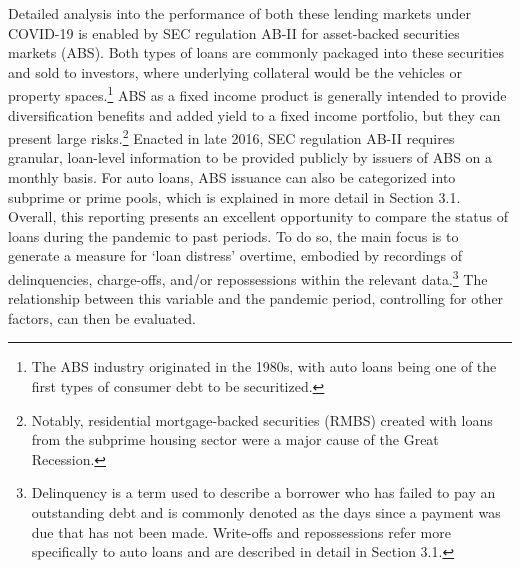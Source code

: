 \documentclass[10.5pt]{article}
\begin{document}
Detailed analysis into the performance of both these lending markets under COVID-19 is enabled by SEC regulation AB-II for asset-backed securities markets (ABS). Both types of loans are commonly packaged into these securities and sold to investors, where underlying collateral would be the vehicles or property spaces.\footnote{The ABS industry originated in the 1980s, with auto loans being one of the first types of consumer debt to be securitized.} ABS as a fixed income product is generally intended to provide diversification benefits and added yield to a fixed income portfolio, but they can present large risks.\footnote{Notably, residential mortgage-backed securities (RMBS) created with loans from the subprime housing sector were a major cause of the Great Recession.} Enacted in late 2016, SEC regulation AB-II requires granular, loan-level information to be provided publicly by issuers of ABS on a monthly basis. For auto loans, ABS issuance can also be categorized into subprime or prime pools, which is explained in more detail in Section 3.1. Overall, this reporting presents an excellent opportunity to compare the status of loans during the pandemic to past periods. To do so, the main focus is to generate a measure for `loan distress' overtime, embodied by recordings of delinquencies, charge-offs, and/or repossessions within the relevant data.\footnote{Delinquency is a term used to describe a borrower who has failed to pay an outstanding debt and is commonly denoted as the days since a payment was due that has not been made. Write-offs and repossessions refer more specifically to auto loans and are described in detail in Section 3.1.} The relationship between this variable and the pandemic period, controlling for other factors, can then be evaluated. 
\end{document}
